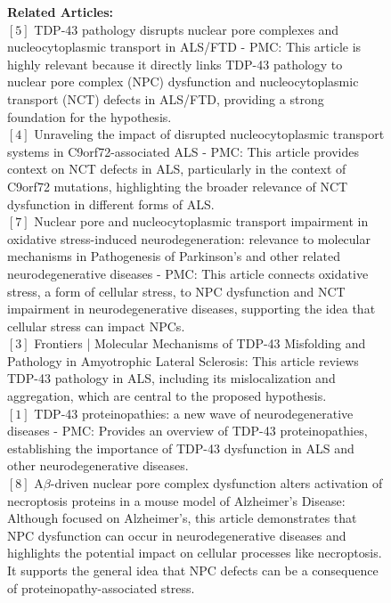 \begin{figure}[htbp!]
\begin{tcolorbox}[
    colback=black!5!white,
    colframe=black!60!white,
    title=\textbf{Example output of a full review by the Reflection agent},
    fonttitle=\bfseries,
    arc=3mm,
    boxrule=1pt,
    bottomrule=2pt,
]
\footnotesize
\textbf{Related Articles:}\\
$[5]$ TDP-43 pathology disrupts nuclear pore complexes and nucleocytoplasmic transport in ALS/FTD - PMC: This article is highly relevant because it directly links TDP-43 pathology to nuclear pore complex (NPC) dysfunction and nucleocytoplasmic transport (NCT) defects in ALS/FTD, providing a strong foundation for the hypothesis.\\
$[4]$ Unraveling the impact of disrupted nucleocytoplasmic transport systems in C9orf72-associated ALS - PMC: This article provides context on NCT defects in ALS, particularly in the context of C9orf72 mutations, highlighting the broader relevance of NCT dysfunction in different forms of ALS.\\
$[7]$ Nuclear pore and nucleocytoplasmic transport impairment in oxidative stress-induced neurodegeneration: relevance to molecular mechanisms in Pathogenesis of Parkinson’s and other related neurodegenerative diseases - PMC: This article connects oxidative stress, a form of cellular stress, to NPC dysfunction and NCT impairment in neurodegenerative diseases, supporting the idea that cellular stress can impact NPCs.\\
$[3]$ Frontiers | Molecular Mechanisms of TDP-43 Misfolding and Pathology in Amyotrophic Lateral Sclerosis: This article reviews TDP-43 pathology in ALS, including its mislocalization and aggregation, which are central to the proposed hypothesis.\\
$[1]$ TDP-43 proteinopathies: a new wave of neurodegenerative diseases - PMC: Provides an overview of TDP-43 proteinopathies, establishing the importance of TDP-43 dysfunction in ALS and other neurodegenerative diseases.\\
$[8]$ A$\beta$-driven nuclear pore complex dysfunction alters activation of necroptosis proteins in a mouse model of Alzheimer’s Disease: Although focused on Alzheimer's, this article demonstrates that NPC dysfunction can occur in neurodegenerative diseases and highlights the potential impact on cellular processes like necroptosis. It supports the general idea that NPC defects can be a consequence of proteinopathy-associated stress.\\

\end{tcolorbox}
\end{figure}
